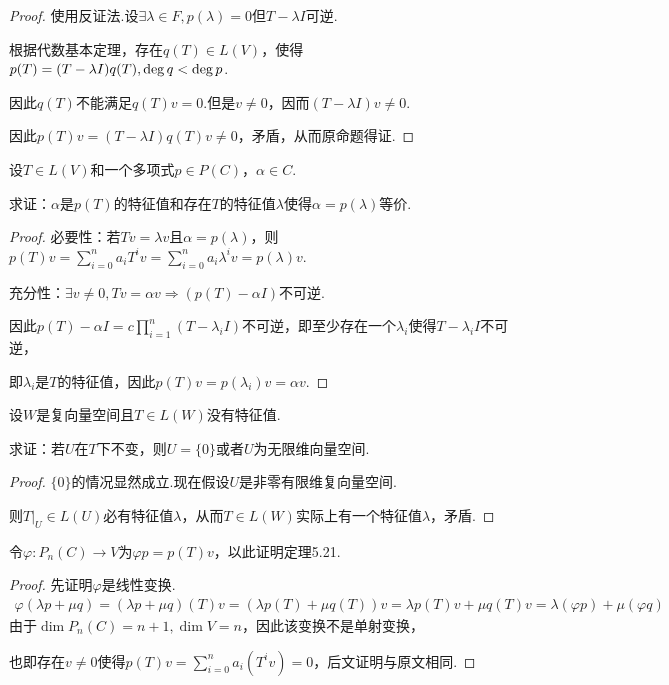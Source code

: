 \begin{proof}
    使用反证法.设\(\exists \lambda \in F,p(\lambda)=0\)但\(T-\lambda I\)可逆.

    根据代数基本定理，存在\(q(T) \in L(V)\)，使得\(p(T)=(T-\lambda I)q(T),\operatorname{deg} q<\operatorname{deg} p\).
    
    因此\(q(T)\)不能满足\(q(T)v=0\).但是\(v \ne 0\)，因而\((T-\lambda I)v \ne 0\).
    
    因此\(p(T)v=(T-\lambda I)q(T)v \ne 0\)，矛盾，从而原命题得证.
\end{proof}

\begin{problem}[11]\label{5.B.11}
    设\(T \in L(V)\)和一个多项式\(p \in P(C)\)，\(\alpha \in C\).

    求证：\(\alpha\)是\(p(T)\)的特征值和存在\(T\)的特征值\(\lambda\)使得\(\alpha=p(\lambda)\)等价.
\end{problem}

\begin{proof}
    必要性：若\(Tv=\lambda v\)且\(\alpha=p(\lambda)\)，则\(p(T)v=\sum_{i=0}^n a_iT^iv=\sum_{i=0}^n a_i\lambda^iv=p(\lambda)v\).

    充分性：\(\exists v \ne 0,Tv=\alpha v \Rightarrow (p(T)-\alpha I)\)不可逆.
    
    因此\(p(T)-\alpha I=c\prod_{i=1}^n (T-\lambda_i I)\)不可逆，即至少存在一个\(\lambda_i\)使得\(T-\lambda_i I\)不可逆，
    
    即\(\lambda_i\)是\(T\)的特征值，因此\(p(T)v=p(\lambda_i)v=\alpha v\).
\end{proof}

\begin{problem}[13]\label{5.B.13}
    设\(W\)是复向量空间且\(T \in L(W)\)没有特征值.

    求证：若\(U\)在\(T\)下不变，则\(U=\{0\}\)或者\(U\)为无限维向量空间.
\end{problem}

\begin{proof}
    \(\{0\}\)的情况显然成立.现在假设\(U\)是非零有限维复向量空间.

    则\(T|_U \in L(U)\)必有特征值\(\lambda\)，从而\(T \in L(W)\)实际上有一个特征值\(\lambda\)，矛盾.
\end{proof}

\begin{problem}[16]\label{5.B.16}
    令\(\varphi:P_n(C) \rightarrow V\)为\(\varphi p=p(T)v\)，以此证明定理5.21.
\end{problem}

\begin{proof}
    先证明\(\varphi\)是线性变换.
    \begin{align*}
        \varphi(\lambda p+\mu q)=(\lambda p+\mu q)(T)v=(\lambda p(T)+\mu q(T))v
        =\lambda p(T)v+\mu q(T)v=\lambda(\varphi p)+\mu(\varphi q)
    \end{align*}
    由于\(\dim P_n(C)=n+1,\dim V=n\)，因此该变换不是单射变换，

    也即存在\(v \ne 0\)使得\(p(T)v=\sum_{i=0}^n a_i(T^iv)=0\)，后文证明与原文相同.
\end{proof}


